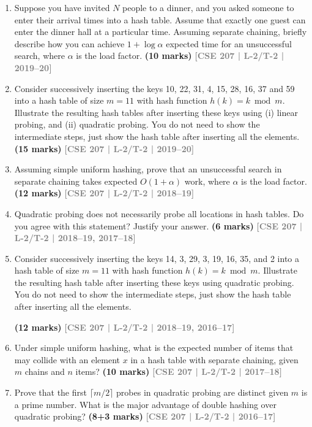 \documentclass[12pt]{article}
\newcommand{\yr}[1]{\hfill\textcolor{gray}{\small\textbf{[#1]}}}
\newcommand{\mk}[1]{\textcolor{orange!70!black}{\small\textbf{(#1 marks)}}}
\begin{document}
\begin{enumerate}
\item Suppose you have invited $N$ people to a dinner, and you asked someone to enter their arrival times into a hash table. Assume that exactly one guest can enter the dinner hall at a particular time. Assuming separate chaining, briefly describe how you can achieve $1 + \log \alpha$ expected time for an unsuccessful search, where $\alpha$ is the load factor.
\mk{10} \yr{CSE 207 | L-2/T-2 | 2019--20}


\item Consider successively inserting the keys 10, 22, 31, 4, 15, 28, 16, 37 and 59 into a hash table of size $m = 11$ with hash function $h(k) = k \bmod m$. Illustrate the resulting hash tables after inserting these keys using (i) linear probing, and (ii) quadratic probing. You do not need to show the intermediate steps, just show the hash table after inserting all the elements.
\mk{15} \yr{CSE 207 | L-2/T-2 | 2019--20}


\item Assuming simple uniform hashing, prove that an unsuccessful search in separate chaining takes expected $O(1 + \alpha)$ work, where $\alpha$ is the load factor.
\mk{12} \yr{CSE 207 | L-2/T-2 | 2018--19}


\item Quadratic probing does not necessarily probe all locations in hash tables. Do you agree with this statement? Justify your answer.
\mk{6} \yr{CSE 207 | L-2/T-2 | 2018--19, 2017--18}


\item Consider successively inserting the keys 14, 3, 29, 3, 19, 16, 35, and 2 into a hash table of size $m = 11$ with hash function $h(k) = k \bmod m$. Illustrate the resulting hash table after inserting these keys using quadratic probing. You do not need to show the intermediate steps, just show the hash table after inserting all the elements.

\mk{12} \yr{CSE 207 | L-2/T-2 | 2018--19, 2016--17}



\item Under simple uniform hashing, what is the expected number of items that may collide with an element $x$ in a hash table with separate chaining, given $m$ chains and $n$ items? \mk{10}
\yr{CSE 207 | L-2/T-2 | 2017--18}


\item Prove that the first $\lceil m/2 \rceil$ probes in quadratic probing are distinct given $m$ is a prime number. What is the major advantage of double hashing over quadratic probing? \mk{8+3}
\yr{CSE 207 | L-2/T-2 | 2016--17}



\end{enumerate}
\end{document}
